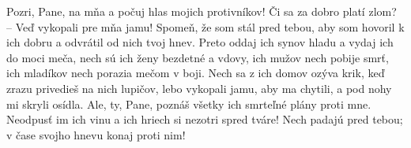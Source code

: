 Pozri, Pane, na mňa
a počuj hlas mojich protivníkov!
Či sa za dobro platí zlom?
– Veď vykopali pre mňa jamu!
Spomeň, že som stál pred tebou,
aby som hovoril k ich dobru
a odvrátil od nich tvoj hnev.
Preto oddaj ich synov hladu
a vydaj ich do moci meča,
nech sú ich ženy bezdetné a vdovy,
ich mužov nech pobije smrť,
ich mladíkov nech porazia mečom v boji.
Nech sa z ich domov ozýva krik,
keď zrazu privedieš na nich lupičov,
lebo vykopali jamu, aby ma chytili,
a pod nohy mi skryli osídla.
Ale, ty, Pane, poznáš
všetky ich smrteľné plány proti mne.
Neodpusť im ich vinu
a ich hriech si nezotri spred tváre!
Nech padajú pred tebou;
v čase svojho hnevu konaj proti nim!